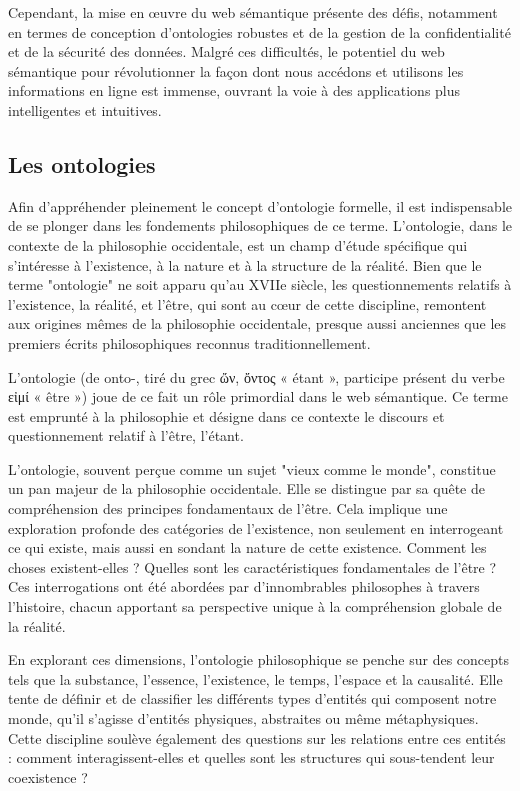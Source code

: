 \documentclass[12pt]{report}
\begin{document}
Cependant, la mise en œuvre du web sémantique présente des défis, notamment en termes de conception d'ontologies robustes et de la gestion de la confidentialité et de la sécurité des données. Malgré ces difficultés, le potentiel du web sémantique pour révolutionner la façon dont nous accédons et utilisons les informations en ligne est immense, ouvrant la voie à des applications plus intelligentes et intuitives.

\subsection{Les ontologies}
Afin d'appréhender pleinement le concept d'ontologie formelle, il est indispensable de se plonger dans les fondements philosophiques de ce terme. L'ontologie, dans le contexte de la philosophie occidentale, est un champ d'étude spécifique qui s'intéresse à l'existence, à la nature et à la structure de la réalité. Bien que le terme "ontologie" ne soit apparu qu'au XVIIe siècle, les questionnements relatifs à l'existence, la réalité, et l'être, qui sont au cœur de cette discipline, remontent aux origines mêmes de la philosophie occidentale, presque aussi anciennes que les premiers écrits philosophiques reconnus traditionnellement.

L'ontologie (de onto-, tiré du grec \textgreek{ὤν, ὄντος} « étant », participe présent du verbe \textgreek{εἰμί} « être ») joue de ce fait un rôle primordial dans le web sémantique. Ce terme est emprunté à la philosophie et désigne dans ce contexte le discours et questionnement relatif à l'être, l'étant. 

L'ontologie, souvent perçue comme un sujet "vieux comme le monde", constitue un pan majeur de la philosophie occidentale. Elle se distingue par sa quête de compréhension des principes fondamentaux de l'être. Cela implique une exploration profonde des catégories de l'existence, non seulement en interrogeant ce qui existe, mais aussi en sondant la nature de cette existence. Comment les choses existent-elles ? Quelles sont les caractéristiques fondamentales de l'être ? Ces interrogations ont été abordées par d'innombrables philosophes à travers l'histoire, chacun apportant sa perspective unique à la compréhension globale de la réalité.

En explorant ces dimensions, l'ontologie philosophique se penche sur des concepts tels que la substance, l'essence, l'existence, le temps, l'espace et la causalité. Elle tente de définir et de classifier les différents types d'entités qui composent notre monde, qu'il s'agisse d'entités physiques, abstraites ou même métaphysiques. Cette discipline soulève également des questions sur les relations entre ces entités : comment interagissent-elles et quelles sont les structures qui sous-tendent leur coexistence ?
\end{document}
